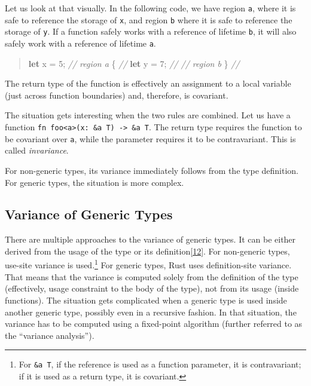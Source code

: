 \documentclass[
  11pt,
  twoside,symmetric]{report}
\newenvironment{Shaded}{}{}
\newcommand{\CommentTok}[1]{\textit{#1}}
\newcommand{\DecValTok}[1]{#1}
\newcommand{\KeywordTok}[1]{\textbf{#1}}
\newcommand{\NormalTok}[1]{#1}
\newcommand{\OperatorTok}[1]{#1}
\begin{document}
Let us look at that visually. In the following code, we have region
\texttt{\textquotesingle{}a}, where it is safe to reference the storage
of \texttt{x}, and region \texttt{\textquotesingle{}b} where it is safe
to reference the storage of \texttt{y}. If a function safely works with
a reference of lifetime \texttt{\textquotesingle{}b}, it will also
safely work with a reference of lifetime \texttt{\textquotesingle{}a}.

\begin{quote}
\begin{Shaded}
\begin{Highlighting}[]

 \KeywordTok{let}\NormalTok{ x }\OperatorTok{=} \DecValTok{5}\OperatorTok{;}        \CommentTok{// region \textquotesingle{}a}
 \OperatorTok{\{}                 \CommentTok{//}
     \KeywordTok{let}\NormalTok{ y }\OperatorTok{=} \DecValTok{7}\OperatorTok{;}    \CommentTok{//            // region \textquotesingle{}b        }
 \OperatorTok{\}}                 \CommentTok{//}
\end{Highlighting}
\end{Shaded}
\end{quote}

The return type of the function is effectively an assignment to a local
variable (just across function boundaries) and, therefore, is covariant.

The situation gets interesting when the two rules are combined. Let us
have a function
\texttt{fn\ foo\textless{}\textquotesingle{}a\textgreater{}(x:\ \&\textquotesingle{}a\ T)\ -\textgreater{}\ \&\textquotesingle{}a\ T}.
The return type requires the function to be covariant over
\texttt{\textquotesingle{}a}, while the parameter requires it to be
contravariant. This is called \emph{invariance}.

For non-generic types, its variance immediately follows from the type
definition. For generic types, the situation is more complex.

\hypertarget{variance-of-generic-types}{%
\subsection{Variance of Generic Types}\label{variance-of-generic-types}}

There are multiple approaches to the variance of generic types. It can
be either derived from the usage of the type or its
definition\protect\hyperlink{ref-Altidor2011}{{[}12{]}}. For non-generic
types, use-site variance is used.\footnote{For
  \texttt{\&\textquotesingle{}a\ T}, if the reference is used as a
  function parameter, it is contravariant; if it is used as a return
  type, it is covariant.} For generic types, Rust uses definition-site
variance. That means that the variance is computed solely from the
definition of the type (effectively, usage constraint to the body of the
type), not from its usage (inside functions). The situation gets
complicated when a generic type is used inside another generic type,
possibly even in a recursive fashion. In that situation, the variance
has to be computed using a fixed-point algorithm (further referred to as
the ``variance analysis'').
\end{document}
